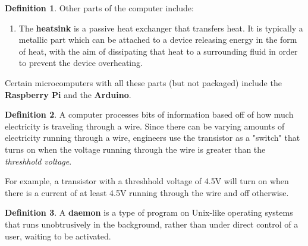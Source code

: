 \documentclass[a4paper, 12pt]{report}
\theoremstyle{remark}
\theoremstyle{definition}
\newtheorem{definition}{Definition}[section]
\begin{document}
\begin{definition}
Other parts of the computer include: 
\begin{enumerate}
    \item The \textbf{heatsink} is a passive heat exchanger that transfers heat. It is typically a metallic part which can be attached to a device releasing energy in the form of heat, with the aim of dissipating that heat to a surrounding fluid in order to prevent the device overheating. 
\end{enumerate}
\end{definition}

Certain microcomputers with all these parts (but not packaged) include the \textbf{Raspberry Pi} and the \textbf{Arduino}. 

\begin{definition}
A computer processes bits of information based off of how much electricity is traveling through a wire. Since there can be varying amounts of electricity running through a wire, engineers use the transistor as a "switch" that turns on when the voltage running through the wire is greater than the \textit{threshhold voltage}. 
\end{definition}

For example, a transistor with a threshhold voltage of 4.5V will turn on when there is a current of at least 4.5V running through the wire and off otherwise. 

\begin{definition}
A \textbf{daemon} is a type of program on Unix-like operating systems that runs unobtrusively in the background, rather than under direct control of a user, waiting to be activated. 
\end{definition}
\end{document}
